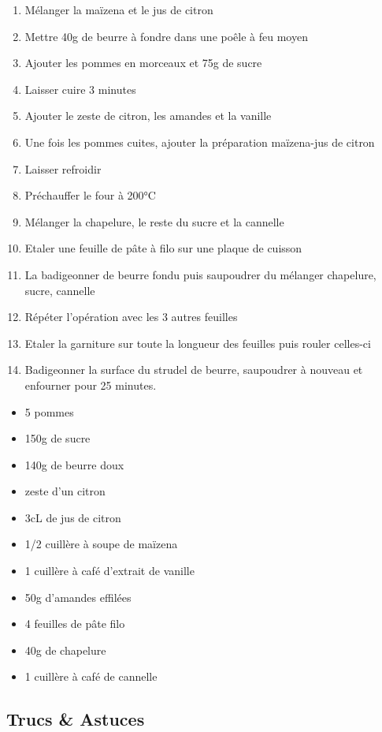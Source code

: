     \begin{minipage}{.7\textwidth}
        \begin{enumerate}
            \item Mélanger la maïzena et le jus de citron
	    \item Mettre 40g de beurre à fondre dans une poêle à feu moyen
	    \item Ajouter les pommes en morceaux et 75g de sucre
	    \item Laisser cuire 3 minutes
	    \item Ajouter le zeste de citron, les amandes et la vanille
	    \item Une fois les pommes cuites, ajouter la préparation maïzena-jus de citron
	    \item Laisser refroidir
	    \item Préchauffer le four à 200°C
	    \item Mélanger la chapelure, le reste du sucre et la cannelle
	    \item Etaler une feuille de pâte à filo sur une plaque de cuisson
	    \item La badigeonner de beurre fondu puis saupoudrer du mélanger chapelure, sucre, cannelle
	    \item Répéter l'opération avec les 3 autres feuilles
	    \item Etaler la garniture sur toute la longueur des feuilles puis rouler celles-ci
	    \item Badigeonner la surface du strudel de beurre, saupoudrer à nouveau et enfourner pour 25 minutes.

        \end{enumerate}
    \end{minipage}
    \begin{minipage}{.3\textwidth}
        \begin{flushleft}
        \begin{itemize}
            \item 5 pommes
	    \item 150g de sucre
	    \item 140g de beurre doux
	    \item zeste d'un citron
	    \item 3cL de jus de citron
	    \item 1/2 cuillère à soupe de maïzena
	    \item 1 cuillère à café d'extrait de vanille
	    \item 50g d'amandes effilées
	    \item 4 feuilles de pâte filo
	    \item 40g de chapelure
	    \item 1 cuillère à café de cannelle

        \end{itemize}
        \end{flushleft}
    \end{minipage}
    
    \vspace{1cm}
    \hline
    \vspace{1cm}
    
    \subsection{Trucs \& Astuces}
        
